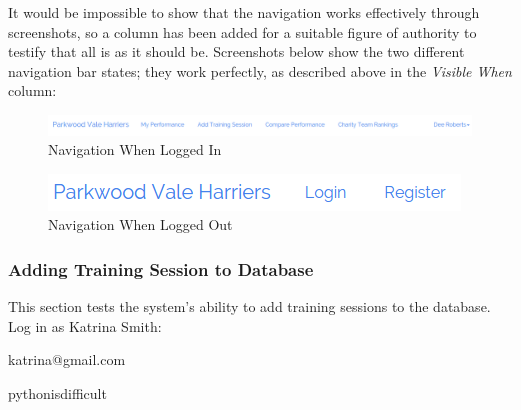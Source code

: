 \documentclass{article}[12pt,a4paper]
\begin{document}
It would be impossible to show that the navigation works effectively through screenshots, so a column has been added for a suitable figure of authority to testify that all is as it should be. Screenshots below show the two different navigation bar states; they work perfectly, as described above in the \textit{Visible When} column:

\begin{figure}[h!]
    \includegraphics[scale=0.33]{images/testing/navigation/logged_in}
    \caption{Navigation When Logged In}
\end{figure}

\begin{figure}[h!]
    \includegraphics[scale=0.40]{images/testing/navigation/logged_out}
    \caption{Navigation When Logged Out}
\end{figure}

\clearpage


\subsubsection{Adding Training Session to Database}
This section tests the system's ability to add training sessions to the database. Log in as Katrina Smith:
\begin{description}[labelindent=1cm]
  \item[Email address:] katrina@gmail.com
  \item[Password:] pythonisdifficult
\end{description}
\end{document}
